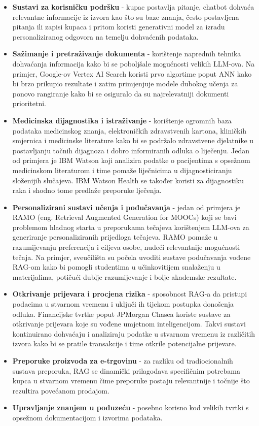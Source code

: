 \documentclass[]{foi}
\begin{document}
\begin{itemize}
    \item \textbf{Sustavi za korisničku podršku} - kupac postavlja pitanje, chatbot dohvaća relevantne informacije iz izvora kao što su baze znanja,
    često postavljena pitanja ili zapisi kupaca i pritom koristi generativni model za izradu personaliziranog odgovora na temelju dohvaćenih podataka.
    \item \textbf{Sažimanje i pretraživanje dokumenta} - korištenje naprednih tehnika dohvaćanja informacija kako bi se poboljšale mogućnosti velikih LLM-ova.
    Na primjer, Google-ov Vertex AI Search koristi prvo algortime poput ANN kako bi brzo prikupio rezultate i zatim primjenjuje modele dubokog učenja za ponovo 
    rangiranje kako bi se osiguralo da su najrelevatniji dokumenti prioritetni.
    \item \textbf{Medicinska dijagnostika i istraživanje} - korištenje ogromnih baza podataka medicinskog znanja, elektroničkih zdravstvenih kartona, kliničkih 
    smjernica i medicinske literature kako bi se podržalo zdravstvene djelatnike u postavljanju točnih dijagnoza i dobro informiranih odluka o liječenju. 
    Jedan od primjera je IBM Watson koji analizira podatke o pacijentima s opsežnom medicinskom literaturom i time pomaže liječnicima u dijagnosticiranju
    složenijih slučajeva. IBM Watson Health se također koristi za dijagnostiku raka i shodno tome predlaže preporuke lječenja.
    \item \textbf{Personalizirani sustavi učenja i podučavanja} - jedan od primjera je RAMO (eng. Retrieval Augmented Generation for MOOCs) koji se bavi problemom hladnog starta u preporukama tečajeva
    korištenjem LLM-ova za generiranje personaliziranih prijedloga tečajeva. RAMO pomaže u razumijevanju preferencija i ciljeva osobe, nudeći relevantnije mogućnosti tečaja.
    Na primjer, sveučilišta su počela uvoditi sustave podučavanja vođene RAG-om kako bi pomogli studentima u učinkovitijem snalaženju u materijalima, potičući dublje razumijevanje i bolje akademske rezultate.
    \item \textbf{Otkrivanje prijevara i procjena rizika} - sposobnost RAG-a da pristupi podacima u stvarnom vremenu i uključi ih tijekom postupka donošenja odluka.
    Financijske tvrtke poput JPMorgan Chasea koriste sustave za otkrivanje prijevara koje su vođene umjetnom inteligencijom. Takvi sustavi kontinuirano dohvaćaju i analiziraju podatke
    u stvarnom vremenu iz različitih izvora kako bi se pratile transakcije i time otkrile potencijalne prijevare. 
    \item \textbf{Preporuke proizvoda za e-trgovinu} - za razliku od tradiocionalnih sustava preporuka, RAG se dinamički prilagođava specifičnim potrebama kupca u stvarnom vremenu čime
    preporuke postaju relevantnije i točnije što rezultira povećanom prodajom.
    \item \textbf{Upravljanje znanjem u poduzeću} - posebno korisno kod velikih tvrtki s opsežnom dokumentacijom i izvorima podataka. 
\end{itemize}
\end{document}
